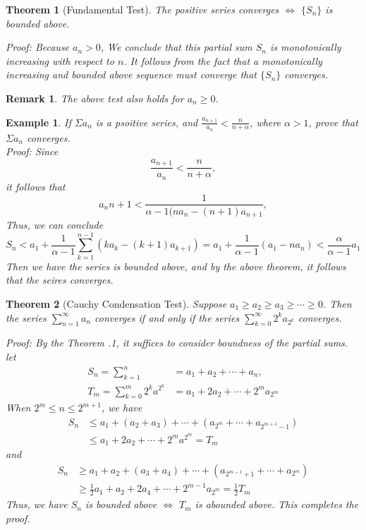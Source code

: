 \documentclass[12pt]{article}
\theoremstyle{oneline}
\newtheorem{theorem}{Theorem}[subsection]
\newtheorem{remark}{Remark}[subsection]
\newtheorem{example}{Example}[subsection]
\theoremstyle{twoline}
\begin{document}
\begin{theorem}[Fundamental Test]
  The positive series converges $\iff$ $\{S_n\}$ is bounded above.

\textit{Proof:} Because $a_n>0$, We conclude that this partial sum $S_n$ is monotonically increasing with respect to $n$. It follows from the fact that a monotonically increasing and bounded above sequence must converge that $\{S_n\}$ converges.
\end{theorem}

\begin{remark}
  The above test also holds for $a_n\geq0$.
\end{remark}

\begin{example}
  If $\Sigma a_n$ is a psoitive series, and $\frac{a_{n+1}}{a_n}<\frac{n}{n+\alpha}$, where $\alpha>1$, prove that $\Sigma a_n$ converges.\\
\textit{Proof:} Since
\[\frac{a_{n+1}}{a_n}<\frac{n}{n+\alpha},\]
it follows that 
\[a_n{n+1}<\frac1{\alpha-1(na_n-(n+1)a_{n+1}},\] 
Thus, we can conclude
\[S_n<a_1+\frac1{\alpha-1}\sum\limits_{k=1}^{n-1}(ka_k-(k+1)a_{k+1})=a_1+\frac1{\alpha-1}(a_1-na_n)<\frac{\alpha}{\alpha-1}a_1\] 
Then we have the series is bounded above, and by the above theorem, it follows that the seires converges.
\end{example}

\begin{theorem}[Cauchy Condensation Test]
  Suppose $a_1\geq a_2\geq a_3\geq\cdots\geq0$. Then the series $\sum\limits_{n=1}^{\infty} a_n$ converges if and only if the series $\sum\limits_{k=0}^\infty 2^ka_{2^k}$ converges.

\textit{Proof:} By the \textit{Theorem \thesubsection.1}, it suffices to consider boundness of the partial sums. let
\begin{align*}
  S_n=\sum\limits_{k=1}^n&=a_1+a_2+\cdots+a_n,\\
  T_m=\sum\limits_{k=0}^m2^ka^{2^k}&=a_1+2a_2+\cdots+2^ma_{2^m}
\end{align*}
When $2^m\leq n\leq 2^{m+1}$, we have
\begin{align*}
  S_n&\leq a_1+(a_2+a_3)+\cdots+(a_{2^m}+\cdots+a_{2^{m+1}-1})\\ 
  &\leq a_1+2a_2+\cdots+2^ma^{2^m}=T_m
\end{align*}
and 
\begin{align*}
  S_n&\geq a_1+a_2+(a_3+a_4)+\cdots+(a_{2^{m-1}+1}+\cdots+a_{2^m})\\
  &\geq \frac12 a_1+a_2+2a_4+\cdots+2^{m-1}a_{2^m}=\frac12T_m
\end{align*}
Thus, we have $S_n$ is bounded above $\iff$ $T_m$ is abounded above. This completes the proof.
\end{theorem}
\end{document}
